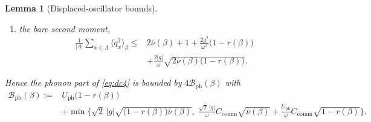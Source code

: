 \documentclass[11pt]{article}
\numberwithin{equation}{section}
\newcommand{\id}{\mathbf{1}}
\newcommand{\Lamb}{\Lambda}
\newcommand{\ph}{\mathrm{ph}}
\newcommand{\hop}{\mathrm{hop}}
\newtheorem{lemma}[theorem]{Lemma}
\theoremstyle{definition}
\begin{document}
\begin{lemma}[Displaced-oscillator bounds]
\begin{enumerate}
$[a_{y,\sigma}^{\dagger}a_{x,\sigma},n_{x}-1]=a_{y,\sigma}^{\dagger}a_{x,\sigma}$ for $y\ne x$,
the terms of \eqref{eq:Hhop} with one index at $x$ combine as
$[H_{\hop,\pi},n_{x}-1]=X_{\uparrow}+X_{\downarrow}$ with
$X_{\sigma}:=D_{\sigma}^{\dagger}a_{x,\sigma}-a_{x,\sigma}^{\dagger}D_{\sigma}$. The six
operators in $D_{\sigma}$ act on distinct sites and anticommute, and
$|t^{(\pi)}_{x,y}|=|\kappa|$, so $D_{\sigma}^{\dagger}D_{\sigma}+D_{\sigma}D_{\sigma}^{\dagger}=6\kappa^{2}\,\id$.
Because $D_{\sigma}$ anticommutes with $a_{x,\sigma}$ and $a_{x,\sigma}^{\dagger}$, the cross
terms of $X_{\sigma}^{\dagger}X_{\sigma}$ vanish and
$X_{\sigma}^{\dagger}X_{\sigma}=n_{x,\sigma}D_{\sigma}D_{\sigma}^{\dagger}+(\id-n_{x,\sigma})D_{\sigma}^{\dagger}D_{\sigma}\le6\kappa^{2}\,\id$,
where $n_{x,\sigma}$ commutes with $D_{\sigma}D_{\sigma}^{\dagger}$ and $D_{\sigma}^{\dagger}D_{\sigma}$.
Hence $\|X_{\sigma}\|\le\sqrt6\,|\kappa|$, the hopping part is at most $2\sqrt6\,|\kappa|$,
and $\|K_{x}\|\le12J+2\sqrt6\,|\kappa|$ for every real $\kappa$. The minimum in
  \eqref{eq:Bph} uses whichever of the two bounds is smaller for the parameters at hand,
  and $\mathcal{B}_{\ph}$ is increasing in $C_{\mathrm{comm}}$, so the certificate
  evaluates the commutator bound with this constant;
\item the bare second moment,
  \begin{equation}
  \begin{aligned}
  \frac{1}{|\Lamb|}\sum_{x\in\Lamb}\big\langle q_{x}^{2}\big\rangle_{\beta}
  \le{}&2\bar\nu(\beta)+1+\frac{2g^{2}}{\omega^{2}}\big(1-r(\beta)\big)\\
  &+\frac{2|g|}{\omega}\sqrt{2\bar\nu(\beta)\big(1-r(\beta)\big)} .
  \end{aligned}
  \label{eq:q2}
  \end{equation}
\end{enumerate}
Hence the phonon part of \eqref{eq:dc4} is bounded by $4\mathcal{B}_{\ph}(\beta)$ with
\begin{equation}
\begin{aligned}
\mathcal{B}_{\ph}(\beta):={}&U_{\mathrm{ph}}\big(1-r(\beta)\big)\\
&+\min\Big\{\sqrt2\,|g|\sqrt{\big(1-r(\beta)\big)\bar\nu(\beta)},\;
\frac{\sqrt2\,|g|}{\omega}C_{\mathrm{comm}}\sqrt{\bar\nu(\beta)}+\frac{U_{\mathrm{ph}}}{\omega}C_{\mathrm{comm}}\sqrt{1-r(\beta)}\Big\}.
\end{aligned}
\label{eq:Bph}
\end{equation}
\end{lemma}
\end{document}
